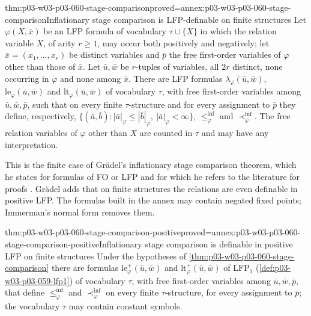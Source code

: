 \begin{hblemma}{thm:p03-w03-p03-060-stage-comparison}{proved=annex:p03-w03-p03-060-stage-comparison}{Inflationary stage comparison is LFP-definable on finite structures}
Let \(\varphi(X,\bar x)\) be an LFP formula of vocabulary
\(\tau\cup\{X\}\) in which the relation variable \(X\), of arity \(r\ge1\),
may occur both positively and negatively; let \(\bar x=(x_1,\ldots,x_r)\)
be distinct variables and \(\bar p\) the free first-order variables of
\(\varphi\) other than those of \(\bar x\). Let \(\bar u,\bar w\) be
\(r\)-tuples of variables, all \(2r\) distinct, none occurring in
\(\varphi\) and none among \(\bar x\). There are LFP formulas \(\lambda_\varphi(\bar u,\bar w)\),
\(\mathrm{le}_\varphi(\bar u,\bar w)\) and \(\mathrm{lt}_\varphi(\bar u,\bar w)\)
of vocabulary \(\tau\), with free first-order variables among
\(\bar u,\bar w,\bar p\), such that on every finite \(\tau\)-structure and
for every assignment to \(\bar p\) they define, respectively,
\(\{(\bar a,\bar b):|\bar a|_\varphi\le|\bar b|_\varphi,\ |\bar a|_\varphi<\infty\}\),
\(\le^{\mathrm{inf}}_\varphi\) and \(\prec^{\mathrm{inf}}_\varphi\). The
free relation variables of \(\varphi\) other than \(X\) are counted in
\(\tau\) and may have any interpretation.
\end{hblemma}

This is the finite case of Gr\"adel's inflationary stage comparison
theorem, which he states for formulas of FO or LFP and for which he refers
to the literature for proofs \cite[Thm.~3.3.49,
p.~176]{Gradel2007FMTDescriptiveChapter}. Gr\"adel adds that on finite
structures the relations are even definable in positive LFP. The formulas
built in the annex may contain negated fixed points; Immerman's normal form
removes them.

\begin{hbcorollary}{thm:p03-w03-p03-060-stage-comparison-positive}{proved=annex:p03-w03-p03-060-stage-comparison-positive}{Inflationary stage comparison is definable in positive LFP on finite structures}
Under the hypotheses of \cref{thm:p03-w03-p03-060-stage-comparison} there
are formulas \(\mathrm{le}^+_\varphi(\bar u,\bar w)\) and
\(\mathrm{lt}^+_\varphi(\bar u,\bar w)\) of \(\mathrm{LFP}_1\)
(\cref{def:p03-w03-p03-059-lfp1}) of vocabulary \(\tau\), with free
first-order variables among \(\bar u,\bar w,\bar p\), that define
\(\le^{\mathrm{inf}}_\varphi\) and \(\prec^{\mathrm{inf}}_\varphi\) on every
finite \(\tau\)-structure, for every assignment to \(\bar p\); the
vocabulary \(\tau\) may contain constant symbols.
\end{hbcorollary}


